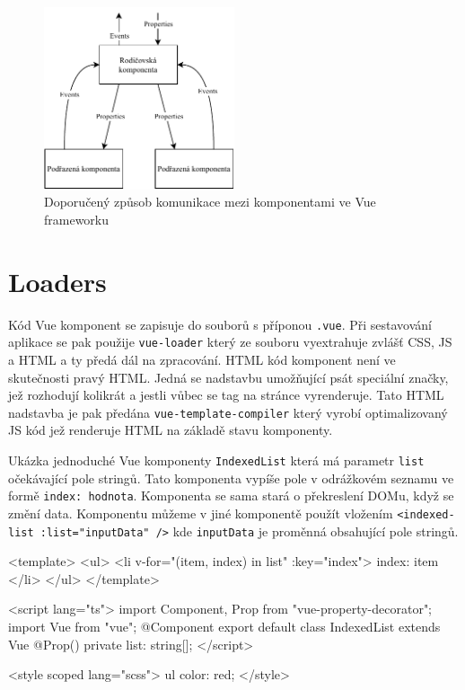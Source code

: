\begin{figure}[h]
    \centering
    \includegraphics[width=0.5\textwidth]{media/vue.pdf}
    \caption{Doporučený způsob komunikace mezi komponentami ve Vue frameworku}
\end{figure}

\section{Loaders}
Kód Vue komponent se zapisuje do souborů s příponou \texttt{.vue}. Při sestavování aplikace se pak použije \texttt{vue-loader} který ze souboru vyextrahuje zvlášť CSS, JS a HTML a ty předá dál na zpracování. HTML kód komponent není ve skutečnosti pravý HTML. Jedná se nadstavbu umožňující psát speciální značky, jež rozhodují kolikrát a jestli vůbec se tag na stránce vyrenderuje. Tato HTML nadstavba je pak předána \texttt{vue-template-compiler} který vyrobí optimalizovaný JS kód jež renderuje HTML na základě stavu komponenty.

\newpage

\begin{prikl}
Ukázka jednoduché Vue komponenty \texttt{IndexedList} která má parametr \texttt{list} očekávající pole stringů. Tato komponenta vypíše pole v odrážkovém seznamu ve formě \texttt{index: hodnota}. Komponenta se sama stará o překreslení DOMu, když se změní data. Komponentu můžeme v jiné komponentě použít vložením \texttt{<indexed-list :list="inputData" />} kde \texttt{inputData} je proměnná obsahující pole stringů.

\begin{code}
<template>
  <ul>
    <li v-for="(item, index) in list" :key="index">
      {{index}}: {{ item }}
    </li>
  </ul>
</template>

<script lang="ts">
  import {Component, Prop} from "vue-property-decorator";
  import Vue from "vue";
  @Component
  export default class IndexedList extends Vue {
    @Prop() private list: string[];
  }
</script>

<style scoped lang="scss">
  ul {
    color: red;
  }
</style>
\end{code}
\end{prikl}

